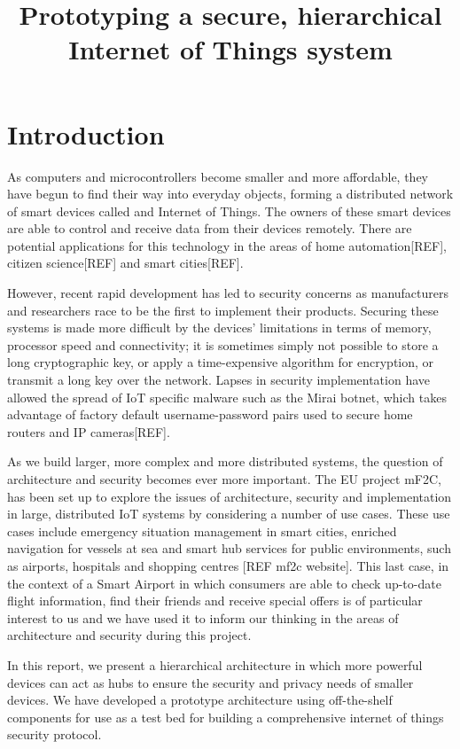 \documentclass{article}
\title{Prototyping a secure, hierarchical Internet of Things system}
\begin{document}
\maketitle

\section{Introduction}
As computers and microcontrollers become smaller and more affordable, they have begun to find their way into everyday objects, forming a distributed network of smart devices called and Internet of Things. The owners of these smart devices are able to control and receive data from their devices remotely. There are potential applications for this technology in the areas of home automation[REF], citizen science[REF] and smart cities[REF].

However, recent rapid development has led to security concerns as manufacturers and researchers race to be the first to implement their products. Securing these systems is made more difficult by the devices’ limitations in terms of memory, processor speed and connectivity; it is sometimes simply not possible to store a long cryptographic key, or apply a time-expensive algorithm for encryption, or transmit a long key over the network. Lapses in security implementation have allowed the spread of IoT specific malware such as the Mirai botnet, which takes advantage of factory default username-password pairs used to secure home routers and IP cameras[REF].

As we build larger, more complex and more distributed systems, the question of architecture and security becomes ever more important. The EU project mF2C, has been set up to explore the issues of architecture, security and implementation in large, distributed IoT systems by considering a number of use cases. These use cases include emergency situation management in smart cities, enriched navigation for vessels at sea and smart hub services for public environments, such as airports, hospitals and shopping centres [REF mf2c website]. This last case, in the context of a Smart Airport in which consumers are able to check up-to-date flight information, find their friends and receive special offers is of particular interest to us and we have used it to inform our thinking in the areas of architecture and security during this project.
 
In this report, we present a hierarchical architecture in which more powerful devices can act as hubs to ensure the security and privacy needs of smaller devices.  We have developed a prototype architecture using off-the-shelf components for use as a test bed for building a comprehensive internet of things security protocol.
\end{document}
